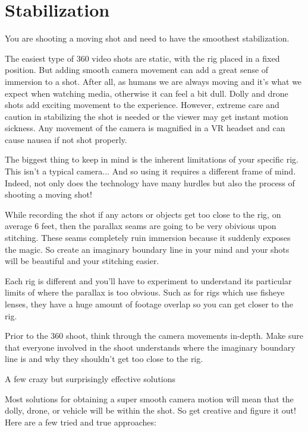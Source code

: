 \chapter{Stabilization}
\pagecolor{white}
\label{chap:24}
\begin{fullwidth}


\problem

{\large You are shooting a moving shot and need to have the smoothest stabilization. \par}

The easiest type of 360 video shots are static, with the rig placed in a fixed position. But adding smooth camera movement can add a great sense of immersion to a shot. After all, as humans we are always moving and it's what we expect when watching media, otherwise it can feel a bit dull. Dolly and drone shots add exciting movement to the experience. However, extreme care and caution in stabilizing the shot is needed or the viewer may get instant motion sickness. Any movement of the camera is magnified in a VR headset and can cause nausea if not shot properly.


\solution

The biggest thing to keep in mind is the inherent limitations of your specific rig. This isn't a typical camera... And so using it requires a different frame of mind. Indeed, not only does the technology have many hurdles but also the process of shooting a moving shot!

While recording the shot if any actors or objects get too close to the rig, on average 6 feet, then the parallax seams are going to be very obivious upon stitching. These seams completely ruin immersion because it suddenly exposes the magic. So create an imaginary boundary line in your mind and your shots will be beautiful and your stitching easier.

Each rig is different and you’ll have to experiment to understand its particular limits of where the parallax is too obvious. Such as for rigs which use fisheye lenses, they have a huge amount of footage overlap so you can get closer to the rig.

Prior to the 360 shoot, think through the camera movements in-depth. Make sure that everyone involved in the shoot understands where the imaginary boundary line is and why they shouldn't get too close to the rig.

{\large A few crazy but surprisingly effective solutions \par}
Most solutions for obtaining a super smooth camera motion will mean that the dolly, drone, or vehicle will be within the shot. So get creative and figure it out! Here are a few tried and true approaches:


\end{fullwidth}

